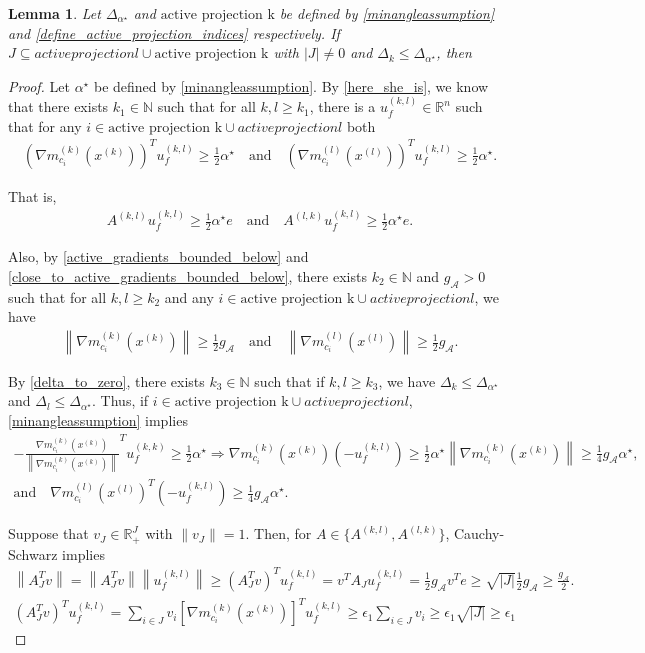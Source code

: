 \documentclass{article}
\newtheorem{lemma}[theorem]{Lemma}
\theoremstyle{case}
\numberwithin{theorem}{subsection}
\newcommand{\dk}{\Delta_k}
\newcommand{\dl}{\Delta_l}
\newcommand{\gmcik}{{\nabla m_{c_i}^{(k)}\left(\xk\right)}}
\newcommand{\gmcil}{{\nabla m_{c_i}^{(l)}\left(\xl\right)}}
\newcommand{\minactivegrad}{{ g_{\mathcal A} }}
\newcommand{\minanglealpha}{{ \alpha^{\star} }}
\newcommand{\minangledelta}{{\Delta_{\alpha^{\star}}}}
\newcommand{\naturals}{\mathbb N}
\newcommand{\Rn}{\mathbb R^n}
\newcommand{\xk}{x^{(k)}}
\newcommand{\xl}{{x^{(l)}}}
\newcommand{\activeprojk}{{\textrm{active projection k}}}
\newcommand{\activeprojl}{{active projection l}}
\begin{document}
\begin{lemma}
Let $\minangledelta$ and $\activeprojk$ be defined by \cref{minangleassumption} and \cref{define_active_projection_indices} respectively.
If $J \subseteq \activeprojl \cup \activeprojk$ with $|J| \ne 0$
and $\dk \le \minangledelta$,
then
\end{lemma}
\begin{proof}
Let $\minanglealpha$ be defined by \cref{minangleassumption}.
By \cref{here_she_is}, we know that there exists $k_1\in\naturals$ such that for all $k, l \ge k_1$, there is a 
$u^{(k, l)}_f \in \Rn$ such that for any $i \in \activeprojk \cup \activeprojl$
both 
\begin{align*}
\left(\gmcik\right)^T u_f^{(k,l)} \ge \frac 1 2 \minanglealpha
\quad \textrm{and} \quad
\left(\gmcil\right)^T u_f^{(k,l)} \ge \frac 1 2 \minanglealpha.
\end{align*}

That is,
\begin{align*}
A^{(k, l)} u_f^{(k,l)} \ge \frac 1 2 \minanglealpha e
\quad \textrm{and} \quad
A^{(l, k)} u_f^{(k,l)} \ge \frac 1 2 \minanglealpha e.
\end{align*}

\color{red}
Also, by \cref{active_gradients_bounded_below} and \cref{close_to_active_gradients_bounded_below},
there exists $k_2\in\naturals$ and $\minactivegrad>0$ such that for all $k, l \ge k_2$ and any $i \in \activeprojk \cup \activeprojl$, we have
\begin{align*}
\left\|\gmcik\right\| \ge \frac 1 2 \minactivegrad
\quad \textrm{and} \quad
\left\|\gmcil\right\| \ge \frac 1 2 \minactivegrad.
\end{align*}


By \cref{delta_to_zero}, there exists $k_3 \in \naturals$ such that if $k, l \ge k_3$, we have
$\dk \le \minangledelta$ and $\dl \le \minangledelta$.
Thus, if $i \in \activeprojk \cup \activeprojl$, \cref{minangleassumption} implies
\begin{align*}
-\frac {\gmcik}{\left\|\gmcik\right\|} ^T u_f^{(k, k)} \ge \frac 1 2 \minanglealpha
\Longrightarrow 
\gmcik\left(-u_f^{(k, l)}\right)\ge \frac 1 2 \minanglealpha \left\|\gmcik\right\| \ge \frac 1 4 \minactivegrad\minanglealpha, \\
\textrm{and} \quad \gmcil^T \left(-u_f^{(k, l)}\right) \ge \frac 1 4 \minactivegrad\minanglealpha.
\end{align*}
\color{black}

Suppose that $v_J \in \mathbb R^J_+$ with $\|v_J\| = 1$.
Then, for $A \in \{A^{(k, l)}, A^{(l, k)}\}$, Cauchy-Schwarz implies
 \begin{align*}
 \left\|A_J^Tv\right\| = \left\|A_J^Tv\right\| \left\|u_f^{(k,l)}\right\| \ge
\left(A_J^Tv\right)^Tu_f^{(k,l)}
= v^TA_J u_f^{(k,l)}
= \frac 1 2 \minactivegrad v^Te
\ge \sqrt{|J|} \frac 1 2 \minactivegrad
\ge \frac {\minactivegrad} 2 .
\end{align*}
\color{red}
\begin{align*}
\left(A_J^Tv\right)^Tu_f^{(k,l)}
= \sum_{i \in J} v_i \left[\gmcik\right]^Tu_f^{(k,l)}
\ge \epsilon_1 \sum_{i \in J} v_i \ge \epsilon_1 \sqrt{|J|} \ge \epsilon_1
\end{align*}
\color{black}


\end{proof}
\end{document}
